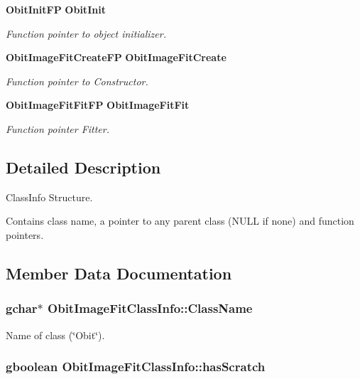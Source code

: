 \begin{CompactItemize}
{\bf Obit\-Init\-FP} {\bf Obit\-Init}
\begin{CompactList}\small\item\em Function pointer to object initializer. \item\end{CompactList}\item 
{\bf Obit\-Image\-Fit\-Create\-FP} {\bf Obit\-Image\-Fit\-Create}
\begin{CompactList}\small\item\em Function pointer to Constructor. \item\end{CompactList}\item 
{\bf Obit\-Image\-Fit\-Fit\-FP} {\bf Obit\-Image\-Fit\-Fit}
\begin{CompactList}\small\item\em Function pointer Fitter. \item\end{CompactList}\end{CompactItemize}


\subsection{Detailed Description}
Class\-Info Structure. 

Contains class name, a pointer to any parent class (NULL if none) and function pointers. 



\subsection{Member Data Documentation}
\subsubsection{\setlength{\rightskip}{0pt plus 5cm}gchar$\ast$ {\bf Obit\-Image\-Fit\-Class\-Info::Class\-Name}}\label{structObitImageFitClassInfo_o2}


Name of class (\char`\"{}Obit\char`\"{}). 

\subsubsection{\setlength{\rightskip}{0pt plus 5cm}gboolean {\bf Obit\-Image\-Fit\-Class\-Info::has\-Scratch}}\label{structObitImageFitClassInfo_o1}


